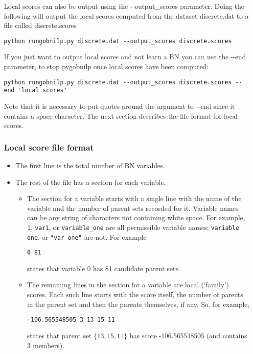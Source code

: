 \documentclass{article}
\newcommand{\pygobnilp}{\textsf{pygobnilp}}
\begin{document}
Local scores can also be output using the -{}-output\_scores
parameter. Doing the following will output the local scores computed from the
dataset discrete.dat to a file called discrete.scores
\begin{verbatim}
python rungobnilp.py discrete.dat --output_scores discrete.scores
\end{verbatim}
If you just want to output local scores and not learn a BN you can use
the -{}-end parameter, to stop \pygobnilp{} once local scores have
been computed:
\begin{verbatim}
python rungobnilp.py discrete.dat --output_scores discrete.scores --end 'local scores'
\end{verbatim}
Note that it is necessary to put quotes around the argument to -{}-end
since it contains a space character. The next section describes the
file format for local scores.

\subsubsection{Local score file format}
\label{sec:scorefileformat}

\begin{itemize}
\item The first line is the total number of BN variables.
\item The rest of the file has a section for each variable.
\begin{itemize}
\item The section for a variable starts with a single line with the
  name of the variable and the number of parent sets recorded for
  it. Variable names can be any string of characters not containing
  white space.  For example, \texttt{1}, \texttt{var1}, or
  \texttt{variable\_one} are all permissible variable names;
  \texttt{variable one}, or \texttt{"var one"} are not.  For example

\texttt{0 81}

states that variable 0 has 81 candidate parent sets.
\item The remaining lines in the section for a variable are local (`family') scores. Each such line starts with the score itself, the number of parents in the parent set and then the parents themselves, if any. So, for example,

\texttt{-106.565548505 3 13 15 11}

states that parent set $\{13,15,11\}$ has score -106.565548505 (and contains 3 members).
\end{itemize}
\end{itemize}
\end{document}
